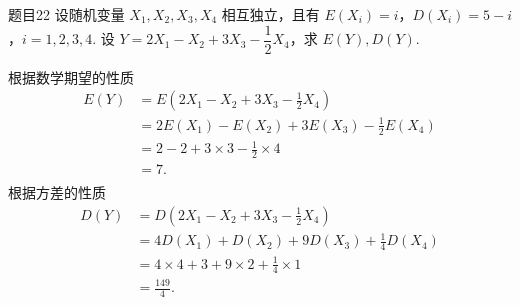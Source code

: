 \begin{question}{题目22}
    设随机变量 $X_1, X_2, X_3, X_4$ 相互独立，且有 $E(X_i)=i$，$D(X_i) = 5-i$，$i = 1, 2, 3, 4$. 设 $Y = 2X_1 - X_2 + 3X_3 - \dfrac{1}{2}X_4$，求 $E(Y), D(Y)$.
\end{question}
\begin{solution}
    根据数学期望的性质
    $$
        \begin{aligned}
            E(Y)
             & = E\left(2X_1 - X_2 + 3X_3 - \frac{1}{2}X_4\right) \\
             & = 2E(X_1) - E(X_2) + 3E(X_3) - \frac{1}{2}E(X_4)   \\
             & = 2 - 2 + 3 \times 3 - \frac{1}{2} \times 4        \\
             & = 7.                                               \\
        \end{aligned}
    $$
    根据方差的性质
    $$
        \begin{aligned}
            D(Y)
             & = D\left(2X_1 - X_2 + 3X_3 - \frac{1}{2}X_4\right)   \\
             & = 4D(X_1) + D(X_2) + 9D(X_3) + \frac{1}{4}D(X_4)     \\
             & = 4 \times 4 + 3 + 9 \times 2 + \frac{1}{4} \times 1 \\
             & = \frac{149}{4}.
        \end{aligned}
    $$
\end{solution}



